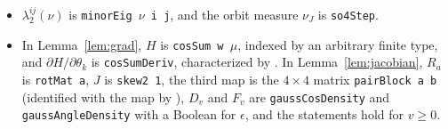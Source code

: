 \documentclass[11pt]{amsart}
\theoremstyle{definition}
\theoremstyle{remark}
\begin{document}
\begin{itemize}
are stated for continuous functions; the passage to $L^2$ is made once, in
.
\item $\lambda_2^{ij}(\nu)$ is \texttt{minorEig $\nu$ i j}, and the orbit measure $\nu_J$ is
\texttt{so4Step}.
\item In Lemma~\ref{lem:grad}, $H$ is \texttt{cosSum w $\mu$}, indexed by an arbitrary finite type,
and $\partial H/\partial\theta_k$ is \texttt{cosSumDeriv}, characterized by
.  In Lemma~\ref{lem:jacobian}, $R_a$ is \texttt{rotMat a},
$J$ is \texttt{skew2 1}, the third map is the $4\times4$ matrix \texttt{pairBlock a b} (identified
with the map by ), $D_v$ and $F_v$ are \texttt{gaussCosDensity} and
\texttt{gaussAngleDensity} with a Boolean for $\epsilon$, and the statements hold for $v\ge0$.
\end{itemize}
\end{document}
